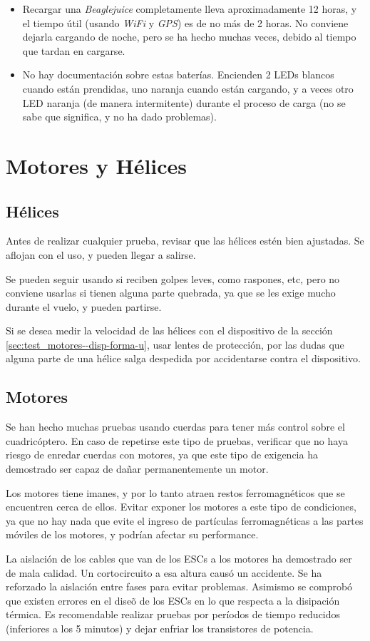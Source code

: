 \documentclass[main]{subfiles}
\begin{document}
\begin{itemize}
\item Recargar una \textit{Beaglejuice} completamente lleva aproximadamente 12 horas, y el tiempo útil (usando \textit{WiFi} y \textit{GPS}) es de no más de 2 horas. No conviene dejarla cargando de noche, pero se ha hecho muchas veces, debido al tiempo que tardan en cargarse.
\item No hay documentación sobre estas baterías. Encienden 2 LEDs blancos cuando están prendidas, uno naranja cuando están cargando, y a veces otro LED naranja (de manera intermitente) durante el proceso de carga (no se sabe que significa, y no ha dado problemas).
\end{itemize}

\section{Motores y Hélices}
\label{sec:hardware-cuidados--motores-y-helices}

\subsection{Hélices}
\label{sec:hardware-cuidados--helices}

Antes de realizar cualquier prueba, revisar que las hélices estén bien ajustadas. Se aflojan con el uso, y pueden llegar a salirse.

Se pueden seguir usando si reciben golpes leves, como raspones, etc, pero no conviene usarlas si tienen alguna parte quebrada, ya que se les exige mucho durante el vuelo, y pueden partirse.

Si se desea medir la velocidad de las hélices con el dispositivo de la sección \ref{sec:test_motores--disp-forma-u}, usar lentes de protección, por las dudas que alguna parte de una hélice salga despedida por accidentarse contra el dispositivo.

\subsection{Motores}
\label{sec:hardware-cuidados--helices}

Se han hecho muchas pruebas usando cuerdas para tener más control sobre el cuadricóptero. En caso de repetirse este tipo de pruebas, verificar que no haya riesgo de enredar cuerdas con motores, ya que este tipo de exigencia ha demostrado ser capaz de dañar permanentemente un motor.

Los motores tiene imanes, y por lo tanto atraen restos ferromagnéticos que se encuentren cerca de ellos. Evitar exponer los motores a este tipo de condiciones, ya que no hay nada que evite el ingreso de partículas ferromagnéticas a las partes móviles de los motores, y podrían afectar su performance.

La aislación de los cables que van de los ESCs a los motores ha demostrado ser de mala calidad. Un cortocircuito a esa altura causó un accidente. Se ha reforzado la aislación entre fases para evitar problemas. Asimismo se comprob\'o que existen errores en el dise\~o de los ESCs en lo que respecta a la disipaci\'on t\'ermica. Es recomendable realizar pruebas por per\'iodos de tiempo reducidos (inferiores a los 5 minutos) y dejar enfriar los transistores de potencia.
\end{document}
